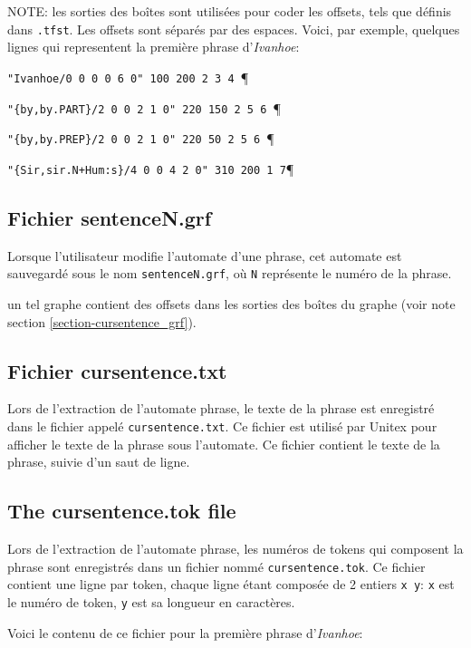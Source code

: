\bigskip
\noindent NOTE: les sorties des boîtes sont utilisées pour coder les offsets, tels que définis dans
\verb+.tfst+. Les offsets sont séparés par des espaces. Voici, par exemple, quelques lignes qui representent la première phrase d'\textit{Ivanhoe}:

\bigskip
\noindent \verb$"Ivanhoe/0 0 0 0 6 0" 100 200 2 3 4 $\P
 
\noindent \verb$"{by,by.PART}/2 0 0 2 1 0" 220 150 2 5 6 $\P

\noindent \verb$"{by,by.PREP}/2 0 0 2 1 0" 220 50 2 5 6 $\P

\noindent \verb$"{Sir,sir.N+Hum:s}/4 0 0 4 2 0" 310 200 1 7$\P 




\subsection{Fichier sentenceN.grf}
Lorsque l’utilisateur modifie l’automate d’une phrase, cet automate est sauvegardé sous
le nom \verb+sentenceN.grf+, où \verb+N+ représente le numéro de la phrase.

un tel graphe contient des offsets dans les sorties des boîtes du graphe (voir note 
section \ref{section-cursentence_grf}).


\subsection{Fichier cursentence.txt}
Lors de l'extraction de l'automate phrase, le texte de la phrase est
enregistré dans le fichier appelé \verb+cursentence.txt+. Ce fichier est utilisé par Unitex pour
afficher le texte de la phrase sous l'automate. Ce fichier contient le texte de la phrase, suivie
d'un saut de ligne.

\subsection{The cursentence.tok file}
Lors de l'extraction de l'automate phrase, les numéros de tokens qui composent la phrase sont
enregistrés dans un fichier nommé \verb+cursentence.tok+. Ce fichier contient une ligne par token,
chaque ligne étant composée de 2 entiers \verb$x y$: \verb$x$ est le numéro de token, \verb$y$ est
sa longueur en caractères.

\bigskip
\noindent Voici le contenu de ce fichier pour la première phrase d'\textit{Ivanhoe}:

